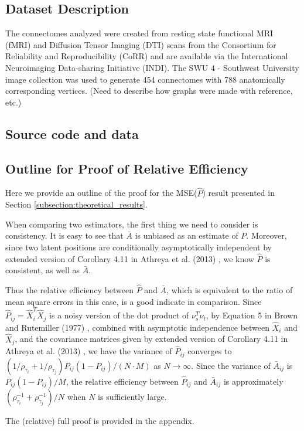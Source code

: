 \subsection{Dataset Description }
\label{subsection:data_description}
	The connectomes analyzed were created from resting state functional MRI (fMRI) and Diffusion Tensor Imaging (DTI) scans from the Consortium for Reliability and Reproducibility (CoRR) and are available via the International Neuroimaging Data-sharing Initiative (INDI).  The SWU 4 - Southwest University image collection was used to generate 454 connectomes with 788 anatomically corresponding vertices.  (Need to describe how graphs were made with reference, etc.)

\subsection{Source code and data}

\subsection{Outline for Proof of Relative Efficiency}
Here we provide an outline of the proof for the MSE($\hat{P}$) result presented in Section \ref{subsection:theoretical_results}.
	
When comparing two estimators, the first thing we need to consider is consistency.
It is easy to see that $\bar{A}$ is unbiased as an estimate of $P$. Moreover, since two latent positions are conditionally asymptotically independent by extended version of Corollary 4.11 in Athreya et al. (2013) \cite{athreya2013limit}, we know $\hat{P}$ is consistent, as well as $\bar{A}$.
	
	Thus the relative efficiency between $\hat{P}$ and $\bar{A}$, which is equivalent to the ratio of mean square errors in this case, is a good indicate in comparison.
	Since $\hat{P}_{ij} = \hat{X}_i^T \hat{X}_j$ is a noisy version of the dot product of $\nu_s^T \nu_t$, by Equation 5 in Brown and Rutemiller (1977) \cite{brown1977means}, combined with asymptotic independence between $\hat{X}_i$ and $\hat{X}_j$, and the covariance matrices given by extended version of Corollary 4.11 in Athreya et al. (2013) \cite{athreya2013limit}, we have the variance of $\hat{P}_{ij}$ converges to $\left( 1/\rho_{\tau_i} + 1/\rho_{\tau_j} \right) P_{ij} (1-P_{ij})/(N \cdot M)$ as $N \rightarrow \infty$. Since the variance of $\bar{A}_{ij}$ is $P_{ij} (1-P_{ij})/M$, the relative efficiency between $\hat{P}_{ij}$ and $\bar{A}_{ij}$ is approximately $(\rho_{\tau_i}^{-1} + \rho_{\tau_j}^{-1})/N$ when $N$ is sufficiently large.
	
	The (relative) full proof is provided in the appendix. 